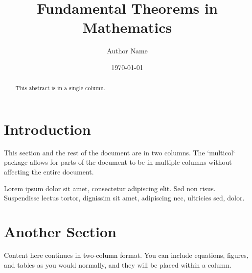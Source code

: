 \documentclass[final]{beamer}
\title{Fundamental Theorems in Mathematics}
\author{Author Name}
\institute{Math Department, University X}
\date{\today}
\begin{document}
\maketitle

\begin{abstract}
This abstract is in a single column.
\end{abstract}

\begin{multicols}{2}
\section{Introduction}
This section and the rest of the document are in two columns. The `multicol` package allows for parts of the document to be in multiple columns without affecting the entire document.

Lorem ipsum dolor sit amet, consectetur adipiscing elit. Sed non risus. Suspendisse lectus tortor, dignissim sit amet, adipiscing nec, ultricies sed, dolor.

\section{Another Section}
Content here continues in two-column format. You can include equations, figures, and tables as you would normally, and they will be placed within a column.

\end{multicols}
\end{document}
